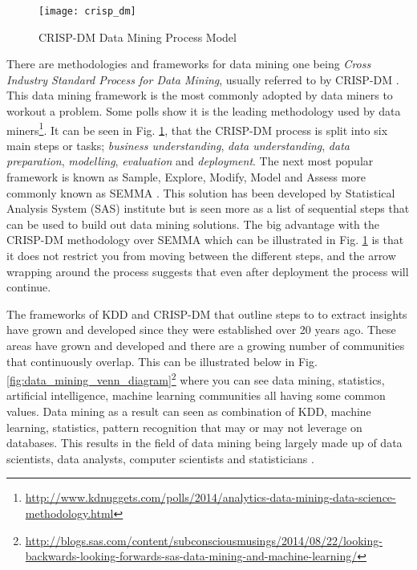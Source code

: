 \begin{figure}[H]
	\texttt{[image: crisp\_dm]}
	\caption{CRISP-DM Data Mining Process Model \\
		\cite[Source:][]{shearer_crisp-dm_2000}		
	}
	\label{fig:crisp_dm}
\end{figure}

There are methodologies and frameworks for data mining one being \textit{Cross Industry Standard Process for Data Mining}, usually referred to by CRISP-DM \citep{shearer_crisp-dm_2000}. This data mining framework is the most commonly adopted by data miners to workout a problem. Some polls show it is the leading methodology used by data miners\footnote{\url{http://www.kdnuggets.com/polls/2014/analytics-data-mining-data-science-methodology.html}}. It can be seen in Fig. \ref{fig:crisp_dm}, that the CRISP-DM process is split into six main steps or tasks; \textit{business understanding}, \textit{data understanding}, \textit{data preparation}, \textit{modelling}, \textit{evaluation} and \textit{deployment}. The next most popular framework is known as Sample, Explore, Modify, Model and Assess more commonly known as SEMMA \citep{azevedo_kdd_2008}. This solution has been developed by Statistical Analysis System (SAS) institute but is seen more as a list of sequential steps that can be used to build out data mining solutions. The big advantage with the CRISP-DM methodology over SEMMA which can be illustrated in Fig. \ref{fig:crisp_dm} is that it does not restrict you from moving between the different steps, and the arrow wrapping around the process suggests that even after deployment the process will continue.  


The frameworks of KDD and CRISP-DM that outline steps to to extract insights have grown and developed since they were established over 20 years ago. These areas have grown and developed and there are a growing number of communities that continuously overlap. This can be illustrated below in Fig. \ref{fig:data_mining_venn_diagram}\footnote{\url{http://blogs.sas.com/content/subconsciousmusings/2014/08/22/looking-backwards-looking-forwards-sas-data-mining-and-machine-learning/}} where you can see data mining, statistics, artificial intelligence, machine learning communities all having some common values. Data mining as a result can seen as combination of KDD, machine learning, statistics, pattern recognition that may or may not leverage on databases. This results in the field of data mining being largely made up of data scientists, data analysts, computer scientists and statisticians \citep{coenen_data_2011}. 

